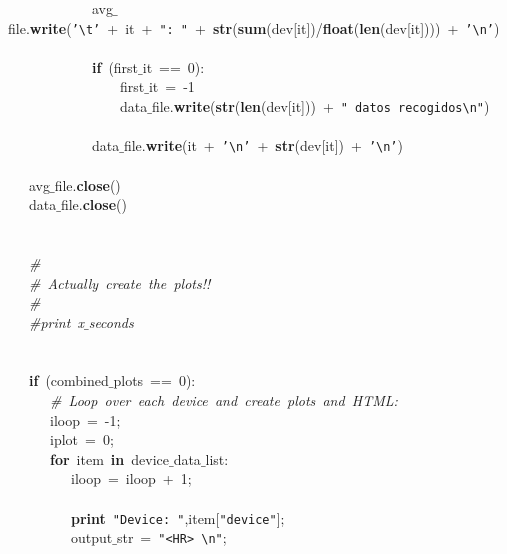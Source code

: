 \mbox{}\ \ \ \ \ \ \ \ \ \ \ \ avg$\_$file.\textbf{write}(\texttt{'\textbackslash{}t'}\ +\ it\ +\ \texttt{"{}:\ "{}}\ +\ \textbf{str}(\textbf{sum}(dev[it])/\textbf{float}(\textbf{len}(dev[it])))\ +\ \texttt{'\textbackslash{}n'}) \\
\mbox{}\ \ \ \ \ \ \ \ \ \ \ \  \\
\mbox{}\ \ \ \ \ \ \ \ \ \ \ \ \textbf{if}\ (first$\_$it\ ==\ 0): \\
\mbox{}\ \ \ \ \ \ \ \ \ \ \ \ \ \ \ \ first$\_$it\ =\ -1 \\
\mbox{}\ \ \ \ \ \ \ \ \ \ \ \ \ \ \ \ data$\_$file.\textbf{write}(\textbf{str}(\textbf{len}(dev[it]))\ +\ \texttt{"{}\ datos\ recogidos\textbackslash{}n"{}}) \\
\mbox{}\ \ \ \ \ \ \ \ \ \ \ \  \\
\mbox{}\ \ \ \ \ \ \ \ \ \ \ \ data$\_$file.\textbf{write}(it\ +\ \texttt{'\textbackslash{}n'}\ +\ \textbf{str}(dev[it])\ +\ \texttt{'\textbackslash{}n'})\ \ \  \\
\mbox{} \\
\mbox{}\ \ \ avg$\_$file.\textbf{close}() \\
\mbox{}\ \ \ data$\_$file.\textbf{close}() \\
\mbox{} \\
\mbox{} \\
\mbox{}\ \ \ \textit{\#} \\
\mbox{}\ \ \ \textit{\#\ Actually\ create\ the\ plots!!} \\
\mbox{}\ \ \ \textit{\#} \\
\mbox{}\ \ \ \textit{\#print\ x$\_$seconds} \\
\mbox{}\ \ \  \\
\mbox{} \\
\mbox{}\ \ \ \textbf{if}\ (combined$\_$plots\ ==\ 0): \\
\mbox{}\ \ \ \ \ \ \textit{\#\ Loop\ over\ each\ device\ and\ create\ plots\ and\ HTML:} \\
\mbox{}\ \ \ \ \ \ iloop\ =\ -1; \\
\mbox{}\ \ \ \ \ \ iplot\ =\ 0; \\
\mbox{}\ \ \ \ \ \ \textbf{for}\ item\ \textbf{in}\ device$\_$data$\_$list: \\
\mbox{}\ \ \ \ \ \ \ \ \ iloop\ =\ iloop\ +\ 1; \\
\mbox{}\ \ \ \ \ \ \ \ \  \\
\mbox{}\ \ \ \ \ \ \ \ \ \textbf{print}\ \texttt{"{}Device:\ "{}},item[\texttt{"{}device"{}}]; \\
\mbox{}\ \ \ \ \ \ \ \ \ output$\_$str\ =\ \texttt{"{}\textless{}HR\textgreater{}\ \textbackslash{}n"{}}; \\
